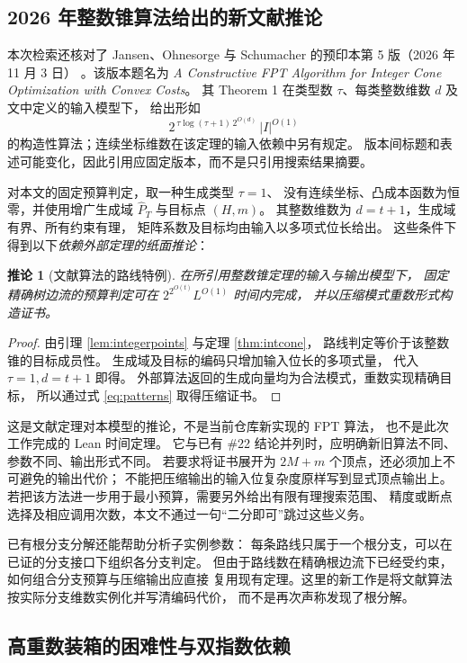 \documentclass[UTF8,a4paper,11pt,fontset=fandol]{ctexart}
\newtheorem{corollary}[theorem]{推论}
\theoremstyle{definition}
\begin{document}
\subsection{2026 年整数锥算法给出的新文献推论}

本次检索还核对了 Jansen、Ohnesorge 与 Schumacher
的预印本第 5 版（2026 年 11 月 3 日）
\cite{jansen2026convex}。该版本题名为
\emph{A Constructive FPT Algorithm for Integer Cone Optimization with Convex Costs}。
其 Theorem 1 在类型数 $\tau$、每类整数维数 $d$ 及文中定义的输入模型下，
给出形如
\[
2^{\,\tau\log(\tau+1)\,2^{O(d)}}\,|I|^{O(1)}
\]
的构造性算法；连续坐标维数在该定理的输入依赖中另有规定。
版本间标题和表述可能变化，因此引用应固定版本，而不是只引用搜索结果摘要。

对本文的固定预算判定，取一种生成类型 $\tau=1$、
没有连续坐标、凸成本函数为恒零，并使用增广生成域
$\widehat P_T$ 与目标点 $(H,m)$。
其整数维数为 $d=t+1$，生成域有界、所有约束有理，
矩阵系数及目标均由输入以多项式位长给出。
这些条件下得到以下\emph{依赖外部定理的纸面推论}：
\begin{corollary}[文献算法的路线特例]\label{cor:literature-fpt}
在所引用整数锥定理的输入与输出模型下，
固定精确树边流的预算判定可在
$2^{2^{O(t)}}L^{O(1)}$ 时间内完成，
并以压缩模式重数形式构造证书。
\end{corollary}
\begin{proof}
由引理 \ref{lem:integerpoints} 与定理 \ref{thm:intcone}，
路线判定等价于该整数锥的目标成员性。
生成域及目标的编码只增加输入位长的多项式量，
代入 $\tau=1,d=t+1$ 即得。
外部算法返回的生成向量均为合法模式，重数实现精确目标，
所以通过式 \eqref{eq:patterns} 取得压缩证书。
\end{proof}

这是文献定理对本模型的推论，不是当前仓库新实现的 FPT 算法，
也不是此次工作完成的 Lean 时间定理。
它与已有 \#22 结论并列时，应明确新旧算法不同、参数不同、输出形式不同。
若要求将证书展开为 $2M+m$ 个顶点，还必须加上不可避免的输出代价；
不能把压缩输出的输入位复杂度原样写到显式顶点输出上。
若把该方法进一步用于最小预算，需要另外给出有限有理搜索范围、
精度或断点选择及相应调用次数，本文不通过一句“二分即可”跳过这些义务。

已有根分支分解还能帮助分析子实例参数：
每条路线只属于一个根分支，可以在已证的分支接口下组织各分支判定。
但由于路线数在精确根边流下已经受约束，如何组合分支预算与压缩输出应直接
复用现有定理。这里的新工作是将文献算法按实际分支维数实例化并写清编码代价，
而不是再次声称发现了根分解。

\subsection{高重数装箱的困难性与双指数依赖}
\end{document}
